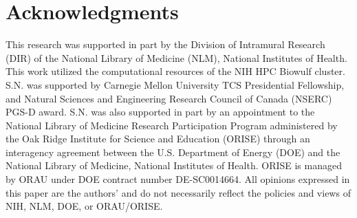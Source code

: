 \documentclass[letterpaper]{article} %
\begin{document}
\section*{Acknowledgments}
This research was supported in part by the Division of Intramural Research (DIR) of the National Library of Medicine (NLM), National Institutes of Health. This work utilized the computational resources of the NIH HPC Biowulf cluster. S.N. was supported by Carnegie Mellon University TCS Presidential Fellowship, and Natural Sciences and Engineering Research Council of Canada (NSERC) PGS-D award. S.N. was also supported in part by an appointment to the National Library of Medicine Research Participation Program administered by the Oak Ridge Institute for Science and Education (ORISE) through an interagency agreement between the U.S. Department of Energy (DOE) and the National Library of Medicine, National Institutes of Health. ORISE is managed by ORAU under DOE contract number DE-SC0014664. All opinions expressed in this paper are the authors’ and do not necessarily reflect the policies and views of NIH, NLM, DOE, or ORAU/ORISE.


\appendix

\end{document}
